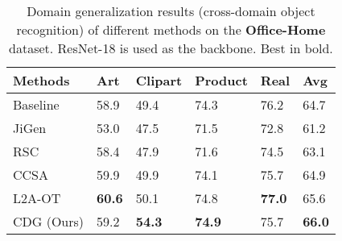 \begin{table*}[htb]
  \caption{Domain generalization results (cross-domain object recognition) of different methods on the \textbf{Office-Home} dataset. ResNet-18 is used as the backbone. Best in bold.}
  \label{tab:home}
  \begin{center}
    \begin{tabularx}{0.8\textwidth}{p{}<{\centering}|p{}<{\centering}|p{}<{\centering}|p{}<{\centering}|p{}<{\centering}|X<{\centering}}

      \toprule[0.6pt]
      Methods                         & Art  & Clipart       & Product       & Real & Avg           \\
      \midrule[0.4pt]
      Baseline                        & 58.9          & 49.4          & 74.3          & 76.2          & 64.7          \\
      JiGen \citep{carlucci2019domain} & 53.0          & 47.5          & 71.5          & 72.8          & 61.2          \\
      RSC \citep{huangRSC2020}         & 58.4          & 47.9          & 71.6          & 74.5          & 63.1          \\
      CCSA \citep{motiian2017unified}  & 59.9          & 49.9          & 74.1          & 75.7          & 64.9          \\ 
      L2A-OT \citep{zhou2020learning}  & \textbf{60.6} & 50.1          & 74.8          & \textbf{77.0} & 65.6          \\
      CDG (Ours)                      & 59.2          & \textbf{54.3} & \textbf{74.9} & 75.7          & \textbf{66.0} \\
      \bottomrule[0.6pt]
    \end{tabularx}
  \end{center}

\end{table*}

